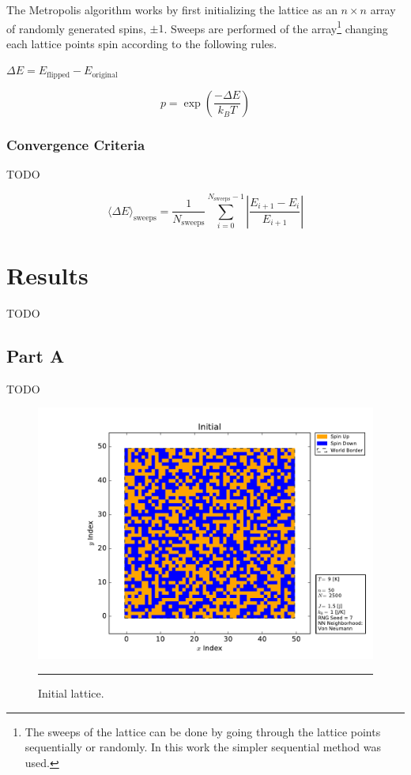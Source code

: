 \documentclass[notitlepage,aps,prd,nofootinbib]{revtex4-1}
\begin{document}
The Metropolis algorithm works by first initializing the lattice as an $n\times n$ array of randomly generated spins, $\pm 1$. Sweeps are performed of the array\footnote{The sweeps of the lattice can be done by going through the lattice points sequentially or randomly. In this work the simpler sequential method was used.} changing each lattice points spin according to the following rules.

$\Delta E = E_{\mathrm{flipped}} - E_{\mathrm{original}}$


\begin{equation}
\label{eq:p}
p = \exp\left(\frac{-\Delta E}{k_{B} T}\right)
\end{equation}



\subsubsection{Convergence Criteria}
\label{subsubsec:convergence}
TODO


\begin{equation}
\label{eq:histE}
\langle \Delta E \rangle_{\mathrm{sweeps}} = \frac{1}{N_{\mathrm{sweeps}}} \sum_{i=0}^{N_{\mathrm{sweeps}}-1} \left|\frac{ E_{i+1} - E_{i}}{E_{i+1}}\right|
\end{equation}



\section{Results}
\label{sec:results}
TODO


\subsection{Part A}
\label{subsec:results_part_a}
TODO


\begin{figure}[!htbc]
  \centering
  \includegraphics[width=.72\textwidth]{../output/plots_for_paper_von_neumann/part_a/initial.pdf}
	{\par\nobreak\rule[9pt]{35em}{0.5pt}\vspace{-5mm}}
	\caption{Initial lattice.}
	\label{fig:initial}
\end{figure}
\end{document}
